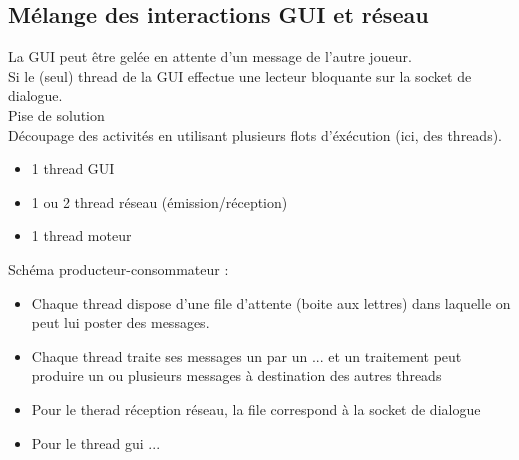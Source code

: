 \documentclass{article}
\begin{document}
\subsection{Mélange des interactions GUI et réseau}
La GUI peut être gelée en attente d'un message de l'autre joueur.\\
Si le (seul) thread de la GUI effectue une lecteur bloquante sur la socket de dialogue.\\
Pise de solution\\
Découpage des activités en utilisant plusieurs flots d'éxécution (ici, des threads).\\
\begin{itemize}
\item 1 thread GUI
\item 1 ou 2 thread réseau (émission/réception)
\item 1 thread moteur
\end{itemize}
Schéma producteur-consommateur :
\begin{itemize}
\item Chaque thread dispose d'une file d'attente (boite aux lettres) dans laquelle on peut lui poster des messages.
\item Chaque thread traite ses messages un par un ... et un traitement peut produire un ou plusieurs messages à destination des autres threads
\item Pour le therad réception réseau, la file correspond à la socket de dialogue
\item Pour le thread gui ...
\end{itemize}
\end{document}
